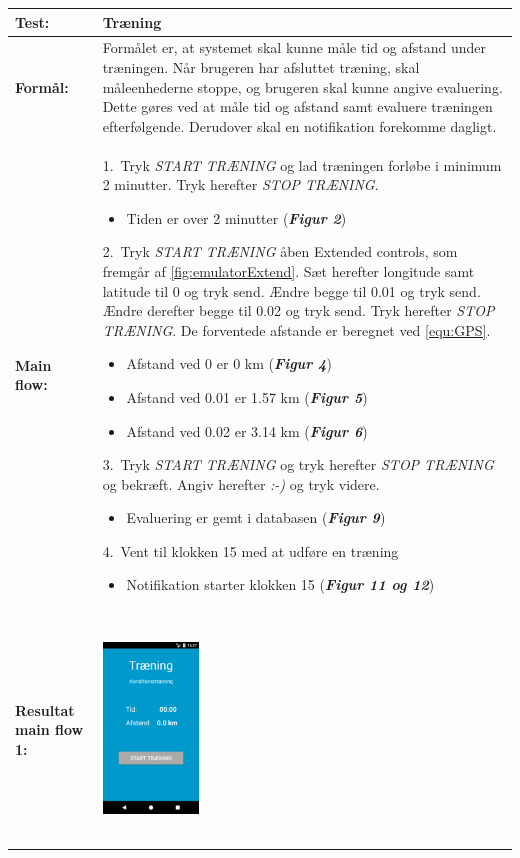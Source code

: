   \begin{longtable}{ | p{2cm} | p{13cm} |} \hline
    \textbf{Test:} & Træning \\ \hline
  \textbf{Formål:} & Formålet er, at systemet skal kunne måle tid og afstand under træningen. Når brugeren har afsluttet træning, skal måleenhederne stoppe, og brugeren skal kunne angive evaluering. Dette gøres ved at måle tid og afstand samt evaluere træningen efterfølgende. Derudover skal en notifikation forekomme dagligt.
 \\ \hline
 	\textbf{Main flow:} & 1.~Tryk \textit{START TRÆNING} og lad træningen forløbe i minimum 2 minutter. Tryk herefter \textit{STOP TRÆNING}.
 	\begin{itemize}
 	\item Tiden er over 2 minutter (\textbf{\textit{Figur 2}})
 	\end{itemize}	
 	2.~Tryk \textit{START TRÆNING} åben Extended controls, som fremgår af \autoref{fig:emulatorExtend}. Sæt herefter longitude samt latitude til 0 og tryk send. Ændre begge til 0.01 og tryk send. Ændre derefter begge til 0.02 og tryk send. Tryk herefter \textit{STOP TRÆNING}. De forventede afstande er beregnet ved \autoref{equ:GPS}. 
 	\begin{itemize}
 	\item Afstand ved 0 er 0 km (\textbf{\textit{Figur 4}})
 	\item Afstand ved 0.01 er 1.57 km (\textbf{\textit{Figur 5}})
 	\item Afstand ved 0.02 er 3.14 km (\textbf{\textit{Figur 6}})
	\end{itemize}
  3.~Tryk \textit{START TRÆNING} og tryk herefter \textit{STOP TRÆNING} og 	bekræft. Angiv herefter \textit{:-)} og tryk videre.
  \begin{itemize}
  \item Evaluering er gemt i databasen (\textbf{\textit{Figur 9}})
  \end{itemize}
   4.~Vent til klokken 15 med at udføre en træning 
  \begin{itemize}
  \item Notifikation starter klokken 15 (\textbf{\textit{Figur 11 og 12}})
  \vspace{1mm}
  \end{itemize}
\\ \hline
\textbf{Resultat main flow 1:} &\hspace{1.5mm}
    \raisebox{-\totalheight}    {\includegraphics[width=0.24\textwidth, height=60mm]{figures/test/traening2}} 

\end{longtable}
